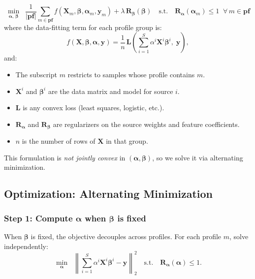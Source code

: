 \documentclass[11pt,a4paper]{article}
\begin{document}
\begin{equation}
\boxed{
\min_{\boldsymbol{\alpha},\,\boldsymbol{\beta}} \;\;
\frac{1}{|\mathbf{pf}|}\sum_{m \in \mathbf{pf}} f(\mathbf{X}_m, \boldsymbol{\beta}, \boldsymbol{\alpha}_m, \mathbf{y}_m)
+ \lambda\, \mathbf{R}_{\boldsymbol{\beta}}(\boldsymbol{\beta})
\quad\text{s.t.}\quad \mathbf{R}_{\boldsymbol{\alpha}}(\boldsymbol{\alpha}_m) \leq 1 \;\;\forall\, m \in \mathbf{pf}
}
\end{equation}
where the data-fitting term for each profile group is:
\begin{equation}
f(\mathbf{X}, \boldsymbol{\beta}, \boldsymbol{\alpha}, \mathbf{y})
= \frac{1}{n}\,\mathbf{L}\!\left(\sum_{i=1}^{S} \alpha^i \mathbf{X}^i \boldsymbol{\beta}^i,\;\mathbf{y}\right),
\end{equation}
and:
\begin{itemize}
    \item The subscript $m$ restricts to samples whose profile contains $m$.
    \item $\mathbf{X}^i$ and $\boldsymbol{\beta}^i$ are the data matrix and model for source $i$.
    \item $\mathbf{L}$ is any convex loss (least squares, logistic, etc.).
    \item $\mathbf{R}_{\boldsymbol{\alpha}}$ and $\mathbf{R}_{\boldsymbol{\beta}}$ are regularizers on the source weights and feature coefficients.
    \item $n$ is the number of rows of $\mathbf{X}$ in that group.
\end{itemize}

This formulation is \emph{not jointly convex} in $(\boldsymbol{\alpha}, \boldsymbol{\beta})$, so we solve it via alternating minimization.

\subsection{Optimization: Alternating Minimization}

\subsubsection{Step 1: Compute $\boldsymbol{\alpha}$ when $\boldsymbol{\beta}$ is fixed}

When $\boldsymbol{\beta}$ is fixed, the objective decouples across profiles. For each profile $m$, solve independently:
\begin{equation}
\min_{\boldsymbol{\alpha}} \;\;
\left\|\sum_{i=1}^{S} \alpha^i \mathbf{X}^i \boldsymbol{\beta}^i - \mathbf{y}\right\|_2^2
\quad\text{s.t.}\quad \mathbf{R}_{\boldsymbol{\alpha}}(\boldsymbol{\alpha}) \leq 1.
\end{equation}
\end{document}
